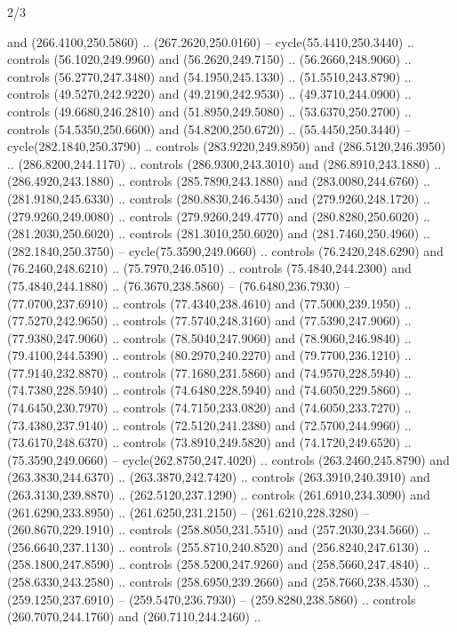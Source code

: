 \begin{flagdescription}{2/3}
\begin{scope}[xshift=0.5\flaglength,yshift=0.5\flagwidth,scale=\stretchfactor]
\begin{scope}[scale=0.001645\flagwidth,yshift=65mm,xshift=-63mm]
\begin{scope}[y=0.80pt, x=0.80pt, yscale=-1,]
\begin{scope}[cm={{1.33333,0.0,0.0,1.33333,(0.0,1e-05)}}]
  and (266.4100,250.5860) .. (267.2620,250.0160) -- cycle(55.4410,250.3440) ..
  controls (56.1020,249.9960) and (56.2620,249.7150) .. (56.2660,248.9060) ..
  controls (56.2770,247.3480) and (54.1950,245.1330) .. (51.5510,243.8790) ..
  controls (49.5270,242.9220) and (49.2190,242.9530) .. (49.3710,244.0900) ..
  controls (49.6680,246.2810) and (51.8950,249.5080) .. (53.6370,250.2700) ..
  controls (54.5350,250.6600) and (54.8200,250.6720) .. (55.4450,250.3440) --
  cycle(282.1840,250.3790) .. controls (283.9220,249.8950) and
  (286.5120,246.3950) .. (286.8200,244.1170) .. controls (286.9300,243.3010) and
  (286.8910,243.1880) .. (286.4920,243.1880) .. controls (285.7890,243.1880) and
  (283.0080,244.6760) .. (281.9180,245.6330) .. controls (280.8830,246.5430) and
  (279.9260,248.1720) .. (279.9260,249.0080) .. controls (279.9260,249.4770) and
  (280.8280,250.6020) .. (281.2030,250.6020) .. controls (281.3010,250.6020) and
  (281.7460,250.4960) .. (282.1840,250.3750) -- cycle(75.3590,249.0660) ..
  controls (76.2420,248.6290) and (76.2460,248.6210) .. (75.7970,246.0510) ..
  controls (75.4840,244.2300) and (75.4840,244.1880) .. (76.3670,238.5860) --
  (76.6480,236.7930) -- (77.0700,237.6910) .. controls (77.4340,238.4610) and
  (77.5000,239.1950) .. (77.5270,242.9650) .. controls (77.5740,248.3160) and
  (77.5390,247.9060) .. (77.9380,247.9060) .. controls (78.5040,247.9060) and
  (78.9060,246.9840) .. (79.4100,244.5390) .. controls (80.2970,240.2270) and
  (79.7700,236.1210) .. (77.9140,232.8870) .. controls (77.1680,231.5860) and
  (74.9570,228.5940) .. (74.7380,228.5940) .. controls (74.6480,228.5940) and
  (74.6050,229.5860) .. (74.6450,230.7970) .. controls (74.7150,233.0820) and
  (74.6050,233.7270) .. (73.4380,237.9140) .. controls (72.5120,241.2380) and
  (72.5700,244.9960) .. (73.6170,248.6370) .. controls (73.8910,249.5820) and
  (74.1720,249.6520) .. (75.3590,249.0660) -- cycle(262.8750,247.4020) ..
  controls (263.2460,245.8790) and (263.3830,244.6370) .. (263.3870,242.7420) ..
  controls (263.3910,240.3910) and (263.3130,239.8870) .. (262.5120,237.1290) ..
  controls (261.6910,234.3090) and (261.6290,233.8950) .. (261.6250,231.2150) --
  (261.6210,228.3280) -- (260.8670,229.1910) .. controls (258.8050,231.5510) and
  (257.2030,234.5660) .. (256.6640,237.1130) .. controls (255.8710,240.8520) and
  (256.8240,247.6130) .. (258.1800,247.8590) .. controls (258.5200,247.9260) and
  (258.5660,247.4840) .. (258.6330,243.2580) .. controls (258.6950,239.2660) and
  (258.7660,238.4530) .. (259.1250,237.6910) -- (259.5470,236.7930) --
  (259.8280,238.5860) .. controls (260.7070,244.1760) and (260.7110,244.2460) ..

\end{scope}
\end{scope}
\end{scope}
\end{scope}
\end{flagdescription}
